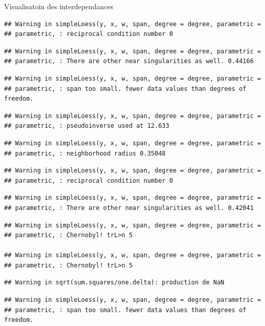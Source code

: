 \documentclass[11pt,ignorenonframetext,]{beamer}
\begin{document}
\begin{frame}[fragile]{Visualisatoin des interdependances}
\begin{verbatim}
## Warning in simpleLoess(y, x, w, span, degree = degree, parametric =
## parametric, : reciprocal condition number 0
\end{verbatim}

\begin{verbatim}
## Warning in simpleLoess(y, x, w, span, degree = degree, parametric =
## parametric, : There are other near singularities as well. 0.44166
\end{verbatim}

\begin{verbatim}
## Warning in simpleLoess(y, x, w, span, degree = degree, parametric =
## parametric, : span too small. fewer data values than degrees of freedom.
\end{verbatim}

\begin{verbatim}
## Warning in simpleLoess(y, x, w, span, degree = degree, parametric =
## parametric, : pseudoinverse used at 12.633
\end{verbatim}

\begin{verbatim}
## Warning in simpleLoess(y, x, w, span, degree = degree, parametric =
## parametric, : neighborhood radius 0.35048
\end{verbatim}

\begin{verbatim}
## Warning in simpleLoess(y, x, w, span, degree = degree, parametric =
## parametric, : reciprocal condition number 0
\end{verbatim}

\begin{verbatim}
## Warning in simpleLoess(y, x, w, span, degree = degree, parametric =
## parametric, : There are other near singularities as well. 0.42041
\end{verbatim}

\begin{verbatim}
## Warning in simpleLoess(y, x, w, span, degree = degree, parametric =
## parametric, : Chernobyl! trL>n 5

## Warning in simpleLoess(y, x, w, span, degree = degree, parametric =
## parametric, : Chernobyl! trL>n 5
\end{verbatim}

\begin{verbatim}
## Warning in sqrt(sum.squares/one.delta): production de NaN
\end{verbatim}

\begin{verbatim}
## Warning in simpleLoess(y, x, w, span, degree = degree, parametric =
## parametric, : span too small. fewer data values than degrees of freedom.
\end{verbatim}


\end{frame}
\end{document}
